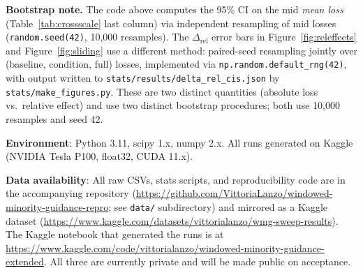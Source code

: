 \documentclass[10pt]{article}
\begin{document}
\noindent\textbf{Bootstrap note.}  The code above computes the 95\% CI on the
mid \emph{mean loss} (Table~\ref{tab:crossscale} last column) via independent
resampling of mid losses (\texttt{random.seed(42)}, 10{,}000 resamples).  The
$\Delta_\mathrm{rel}$ error bars in Figure~\ref{fig:releffects} and
Figure~\ref{fig:sliding} use a different method: paired-seed resampling jointly
over (baseline, condition, full) losses, implemented via
\texttt{np.random.default\_rng(42)}, with output written to
\texttt{stats/results/delta\_rel\_cis.json} by \texttt{stats/make\_figures.py}.
These are two distinct quantities (absolute loss vs.\ relative effect) and use
two distinct bootstrap procedures; both use 10{,}000 resamples and seed 42.

\noindent\textbf{Environment}: Python 3.11, scipy 1.x, numpy 2.x.  All runs
generated on Kaggle (NVIDIA Tesla P100, float32, CUDA 11.x).

\noindent\textbf{Data availability}: All raw CSVs, stats scripts, and
reproducibility code are in the accompanying repository
(\url{https://github.com/VittoriaLanzo/windowed-minority-guidance-repro};
see \texttt{data/} subdirectory) and mirrored as a Kaggle dataset
(\url{https://www.kaggle.com/datasets/vittorialanzo/wmg-sweep-results}).
The Kaggle notebook that generated the runs is at
\url{https://www.kaggle.com/code/vittorialanzo/windowed-minority-guidance-extended}.
All three are currently private and will be made public on acceptance.
\end{document}
